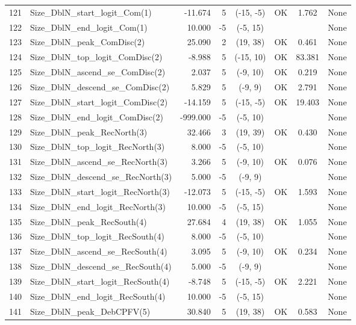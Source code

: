\documentclass[12pt,]{article}
\begin{document}
\begin{landscape}
\begin{longtable}{rlrrcccl}
  121 & Size\_DblN\_start\_logit\_Com(1) & -11.674 & 5 & (-15, -5) & OK & 1.762 & None \\ 
  122 & Size\_DblN\_end\_logit\_Com(1) & 10.000 & -5 & (-5, 15) &  &  & None \\ 
  123 & Size\_DblN\_peak\_ComDisc(2) & 25.090 & 2 & (19, 38) & OK & 0.461 & None \\ 
  124 & Size\_DblN\_top\_logit\_ComDisc(2) & -8.988 & 5 & (-15, 10) & OK & 83.381 & None \\ 
  125 & Size\_DblN\_ascend\_se\_ComDisc(2) & 2.037 & 5 & (-9, 10) & OK & 0.219 & None \\ 
  126 & Size\_DblN\_descend\_se\_ComDisc(2) & 5.829 & 5 & (-9, 9) & OK & 2.791 & None \\ 
  127 & Size\_DblN\_start\_logit\_ComDisc(2) & -14.159 & 5 & (-15, -5) & OK & 19.403 & None \\ 
  128 & Size\_DblN\_end\_logit\_ComDisc(2) & -999.000 & -5 & (-5, 10) &  &  & None \\ 
  129 & Size\_DblN\_peak\_RecNorth(3) & 32.466 & 3 & (19, 39) & OK & 0.430 & None \\ 
  130 & Size\_DblN\_top\_logit\_RecNorth(3) & 8.000 & -5 & (-5, 10) &  &  & None \\ 
  131 & Size\_DblN\_ascend\_se\_RecNorth(3) & 3.266 & 5 & (-9, 10) & OK & 0.076 & None \\ 
  132 & Size\_DblN\_descend\_se\_RecNorth(3) & 5.000 & -5 & (-9, 9) &  &  & None \\ 
  133 & Size\_DblN\_start\_logit\_RecNorth(3) & -12.073 & 5 & (-15, -5) & OK & 1.593 & None \\ 
  134 & Size\_DblN\_end\_logit\_RecNorth(3) & 10.000 & -5 & (-5, 15) &  &  & None \\ 
  135 & Size\_DblN\_peak\_RecSouth(4) & 27.684 & 4 & (19, 38) & OK & 1.055 & None \\ 
  136 & Size\_DblN\_top\_logit\_RecSouth(4) & 8.000 & -5 & (-5, 10) &  &  & None \\ 
  137 & Size\_DblN\_ascend\_se\_RecSouth(4) & 3.095 & 5 & (-9, 10) & OK & 0.234 & None \\ 
  138 & Size\_DblN\_descend\_se\_RecSouth(4) & 5.000 & -5 & (-9, 9) &  &  & None \\ 
  139 & Size\_DblN\_start\_logit\_RecSouth(4) & -8.748 & 5 & (-15, -5) & OK & 2.221 & None \\ 
  140 & Size\_DblN\_end\_logit\_RecSouth(4) & 10.000 & -5 & (-5, 15) &  &  & None \\ 
  141 & Size\_DblN\_peak\_DebCPFV(5) & 30.840 & 5 & (19, 38) & OK & 0.583 & None \\ 

\end{longtable}
\end{landscape}
\end{document}

